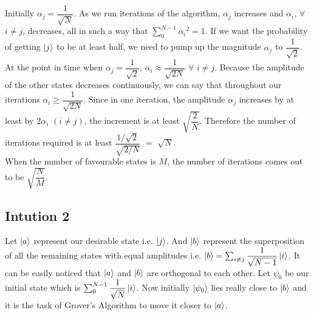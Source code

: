\documentclass[13pt]{article}
\begin{document}
Initially $\alpha_j = \dfrac{1}{\sqrt{N}}$. As we run iterations of the algorithm, $\alpha_j$ increases and $\alpha_i$, $\forall$ $i \neq j$, decreases, all in such a way that $\sum_0 ^{N-1} {\alpha_i}^2 = 1$.
If we want the probability of getting $\ket{j}$ to be at least half, we need to pump up the magnitude $\alpha_j$ to $\dfrac{1}{\sqrt{2}}$. At the point in time when $\alpha_j = \dfrac{1}{\sqrt{2}}$, $\alpha_i \approx \dfrac{1}{\sqrt{2N}}$ $\forall$ $i \neq j$. Because the amplitude of the other states decreases continuously, we can say that throughout our iterations $\alpha_i \geq \dfrac{1}{\sqrt{2N}}$. Since in one iteration, the amplitude $\alpha_j$ increases by at least by $2 \alpha_i$ $\left( i \neq j\right)$, the increment is at least $\sqrt{\dfrac{2}{N}}$. Therefore the number of iterations required is at least $\dfrac{1 / \sqrt{2}}{\sqrt{2 / N}}$ $=$ $\sqrt{N}$.\\
When the number of favourable states is $M$, the number of iterations comes out to be $\sqrt{\dfrac{N}{M}}$.

\subsection{Intution 2}

Let $\ket{a}$ represent our desirable state i.e. $\ket{j}$. And $\ket{b}$ represent the superposition of all the remaining states with equal amplitudes i.e. $\ket{b} = \sum_{i \neq j} \dfrac{1}{\sqrt{N - 1}} \ket{i}$. It can be easily noticed that $\ket{a}$ and $\ket{b}$ are orthogonal to each other. Let $\psi_0$ be our initial state which is $\sum_{0}^{N - 1} \dfrac{1}{\sqrt{N}} \ket{i}$. Now initially $\ket{\psi_0}$ lies really close to $\ket{b}$ and it is the task of Grover's Algorithm to move it closer to $\ket{a}$.\\[4pt]

\end{document}
